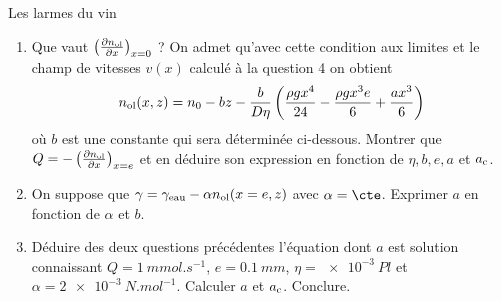 \begin{exo}[PC]{Les larmes du vin}
\begin{quest}
\begin{itemize}
   \end{itemize}
   \begin{enumerate}
   \item Que vaut $\left(\frac{\partial n_{\rm{ol}}}{\partial x}\right)_{x=0}$ ? On admet qu'avec cette condition aux limites et le champ de vitesses $v(x)$ calculé à la question 4 on obtient
   \begin{equation*}
    n_{\rm{ol}}(x,z)=n_0-bz-\frac{b}{D\eta}\left(\frac{\rho g x^4}{24}-\frac{\rho g x^3 e}{6}+\frac{ax^3}{6}\right)
    \end{equation*}
    où $b$ est une constante qui sera déterminée ci-dessous. Montrer que $Q=-\left(\frac{\partial n_{\rm{ol}}}{\partial x}\right)_{x=e}$ et en déduire son expression en fonction de $\eta,b,e,a$ et $a_{\rm{c}}$.
    \item On suppose que $\gamma=\gamma_{\rm{eau}}-\alpha n_{\rm{ol}}(x=e,z)$ avec $\alpha=\cte$. Exprimer $a$ en fonction de $\alpha$ et $b$.
    \item Déduire des deux questions précédentes l'équation dont $a$ est solution connaissant $Q=\SI{1}{mmol.s^{-1}}$, $e=\SI{0,1}{mm}$, $\eta=\SI{e-3}{Pl}$ et $\alpha=\SI{2e-3}{N.mol^{-1}}$. Calculer $a$ et $a_{\rm{c}}$. Conclure.
   \end{enumerate}
\end{quest}
\end{exo}

